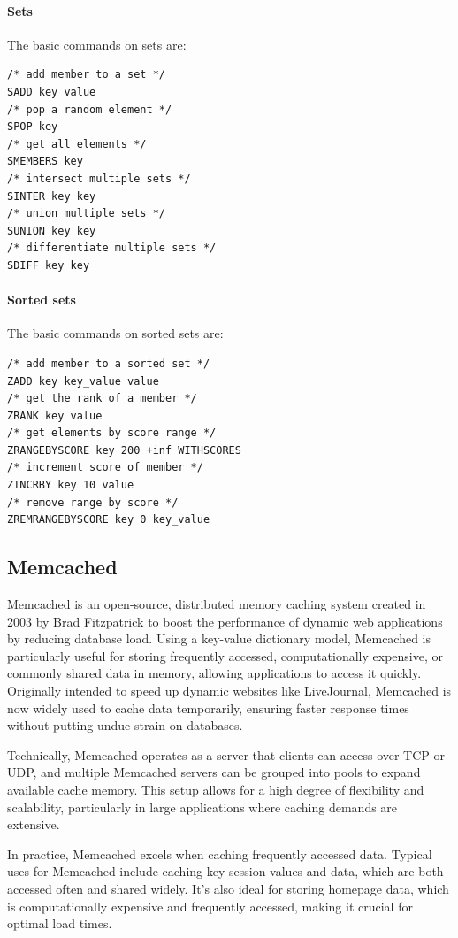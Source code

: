 \paragraph*{Sets}
The basic commands on sets are: 
\begin{lstlisting}[style=Redis]
/* add member to a set */
SADD key value
/* pop a random element */
SPOP key
/* get all elements */
SMEMBERS key
/* intersect multiple sets */
SINTER key key
/* union multiple sets */
SUNION key key
/* differentiate multiple sets */
SDIFF key key
\end{lstlisting}

\paragraph*{Sorted sets}
The basic commands on sorted sets are: 
\begin{lstlisting}[style=Redis]
/* add member to a sorted set */
ZADD key key_value value
/* get the rank of a member */
ZRANK key value
/* get elements by score range */
ZRANGEBYSCORE key 200 +inf WITHSCORES
/* increment score of member */
ZINCRBY key 10 value 
/* remove range by score */
ZREMRANGEBYSCORE key 0 key_value
\end{lstlisting}

\subsection{Memcached}
Memcached is an open-source, distributed memory caching system created in 2003 by Brad Fitzpatrick to boost the performance of dynamic web applications by reducing database load. 
Using a key-value dictionary model, Memcached is particularly useful for storing frequently accessed, computationally expensive, or commonly shared data in memory, allowing applications to access it quickly. 
Originally intended to speed up dynamic websites like LiveJournal, Memcached is now widely used to cache data temporarily, ensuring faster response times without putting undue strain on databases.

Technically, Memcached operates as a server that clients can access over TCP or UDP, and multiple Memcached servers can be grouped into pools to expand available cache memory. 
This setup allows for a high degree of flexibility and scalability, particularly in large applications where caching demands are extensive.

In practice, Memcached excels when caching frequently accessed data. 
Typical uses for Memcached include caching key session values and data, which are both accessed often and shared widely.
It's also ideal for storing homepage data, which is computationally expensive and frequently accessed, making it crucial for optimal load times.

